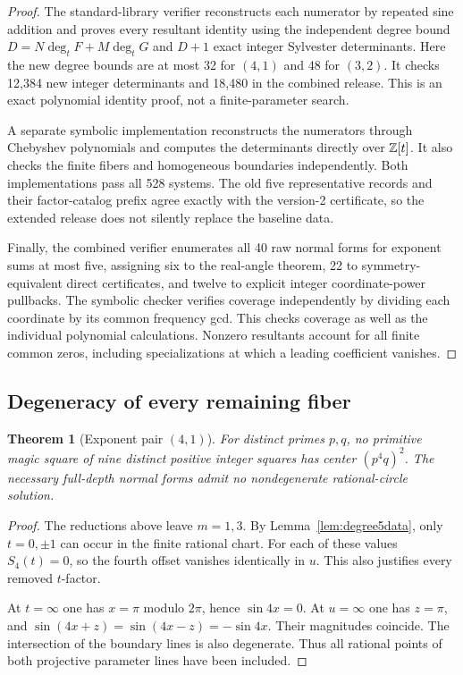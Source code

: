 \documentclass[11pt]{article}
\newtheorem{theorem}{Theorem}[section]
\theoremstyle{definition}\newtheorem{definition}[theorem]{Definition}
\theoremstyle{remark}\newtheorem{remark}[theorem]{Remark}
\begin{document}
\begin{proof}
The standard-library verifier reconstructs each numerator by repeated sine addition and proves every resultant identity using the independent degree bound $D=N\deg_tF+M\deg_tG$ and $D+1$ exact integer Sylvester determinants. Here the new degree bounds are at most 32 for $(4,1)$ and 48 for $(3,2)$. It checks 12,384 new integer determinants and 18,480 in the combined release. This is an exact polynomial identity proof, not a finite-parameter search.

A separate symbolic implementation reconstructs the numerators through Chebyshev polynomials and computes the determinants directly over $\mathbb Z[t]$. It also checks the finite fibers and homogeneous boundaries independently. Both implementations pass all 528 systems. The old five representative records and their factor-catalog prefix agree exactly with the version-2 certificate, so the extended release does not silently replace the baseline data.

Finally, the combined verifier enumerates all 40 raw normal forms for exponent sums at most five, assigning six to the real-angle theorem, 22 to symmetry-equivalent direct certificates, and twelve to explicit integer coordinate-power pullbacks. The symbolic checker verifies coverage independently by dividing each coordinate by its common frequency gcd. This checks coverage as well as the individual polynomial calculations. Nonzero resultants account for all finite common zeros, including specializations at which a leading coefficient vanishes.
\end{proof}

\subsection{Degeneracy of every remaining fiber}
\begin{theorem}[Exponent pair $(4,1)$]\label{thm:41}
For distinct primes $p,q$, no primitive magic square of nine distinct positive integer squares has center $(p^4q)^2$. The necessary full-depth normal forms admit no nondegenerate rational-circle solution.
\end{theorem}
\begin{proof}
The reductions above leave $m=1,3$. By Lemma~\ref{lem:degree5data}, only $t=0,\pm1$ can occur in the finite rational chart. For each of these values $S_4(t)=0$, so the fourth offset vanishes identically in $u$. This also justifies every removed $t$-factor.

At $t=\infty$ one has $x=\pi$ modulo $2\pi$, hence $\sin4x=0$. At $u=\infty$ one has $z=\pi$, and $\sin(4x+z)=\sin(4x-z)=-\sin4x$. Their magnitudes coincide. The intersection of the boundary lines is also degenerate. Thus all rational points of both projective parameter lines have been included.
\end{proof}
\end{document}
